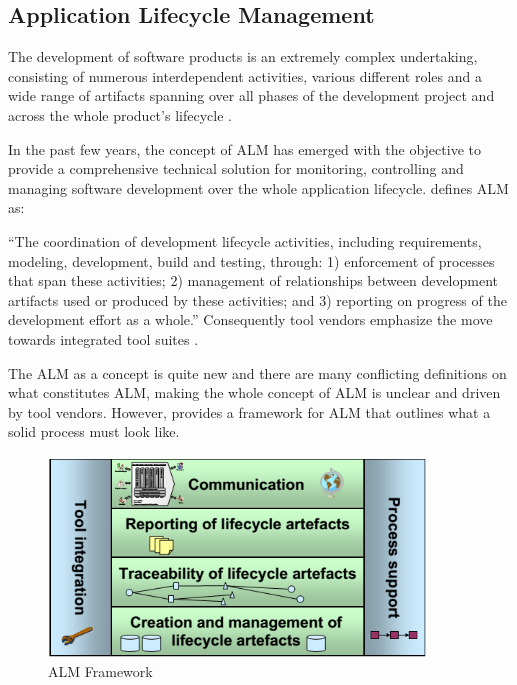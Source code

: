 \subsection{Application Lifecycle Management}

The development of software products is an extremely complex undertaking, consisting of numerous interdependent activities, various different roles and a wide range of artifacts spanning over all phases of the development project and across the whole product's lifecycle \citep{lacheiner2011}. 

In the past few years, the concept of \acf{ALM} has emerged with the objective to provide a comprehensive technical solution for monitoring, controlling and managing software development over the whole application lifecycle. \citep{Schwaber2006} defines \ac{ALM} as:

“The coordination of development lifecycle activities, including requirements, modeling, development, build and testing, through: 1) enforcement of processes that span these activities; 2) management of relationships between development artifacts used or produced by these activities; and 3) reporting on progress of the development effort as a whole.” Consequently tool vendors emphasize the move towards integrated tool suites \citep{lacheiner2011}.

The \ac{ALM} as a concept is quite new and there are many conflicting definitions on what constitutes \ac{ALM}, making the whole concept of ALM is unclear and driven by tool vendors. However, \citep{kaariainen2011towards} provides a framework for \ac{ALM} that outlines what a solid process must look like.


\begin{figure}[htp]
\begin{center}
  \includegraphics[width=10cm]{chapters/background/img/alm-framework.png}
  \caption[ALM Framework]{ALM Framework \citep{kaariainen2011towards}}
  \label{fg:alm-framework}
\end{center}
\end{figure}

